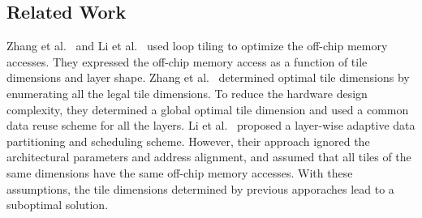 \documentclass[a4paper,10pt]{article}
\begin{document}
\subsection{Related Work}
Zhang et al.~\cite{zhang2015optimizing} and Li et al.~\cite{Li2018SmartShuttleOO} used loop tiling to optimize the off-chip memory accesses. They expressed the off-chip memory access as a function of tile dimensions and layer shape. Zhang et al.~\cite{zhang2015optimizing} determined optimal tile dimensions by enumerating all the legal tile dimensions. To reduce the hardware design complexity, they determined a global optimal tile dimension and used a common data reuse scheme for all the layers. 
Li et al.~\cite{Li2018SmartShuttleOO} proposed a layer-wise adaptive data partitioning and scheduling scheme. However, their approach ignored the architectural parameters and address alignment, and assumed that all tiles of the same dimensions have the same off-chip memory accesses. With these assumptions, the tile dimensions determined by previous apporaches lead to a suboptimal solution.
\end{document}
